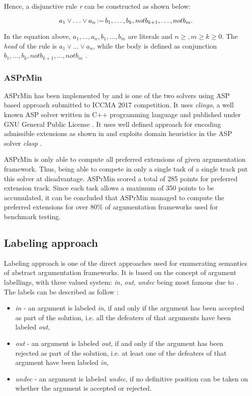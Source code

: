 Hence, a disjunctive rule \textit{r} can be constructed as shown below:

\begin{equation}
	a_1 \lor \ldots \lor a_n \mathop{\vcenter{\hbox{$:$}}-} b_1, \ldots, b_k, not b_{k+1}, \ldots, not b_m.
\end{equation}

In the equation above, $ a_1, \ldots, a_n, b_1, \ldots, b_m$ are literals and $ n \geq , m \geq k \geq 0$. The \textit{head} of the rule is $ a_1 \lor \ldots \lor a_n $, while the body is defined as conjunction $ b_1, \ldots, b_k, not b_{k+1}, \ldots, not b_m $ \citep{bonattiASP}.


\subsubsection{ASPrMin}
ASPrMin has been implemented by \citet{asprmin} and is one of the two solvers using ASP based approach submitted to ICCMA 2017 competition. It uses \textit{clingo}, a well known ASP solver written in C++ programming language and published under GNU General Public License \citep{clingo}. It uses well defined approach for encoding admissible extensions as shown in \citet{asp3} and exploits domain heuristics in the ASP solver \textit{clasp} \citep{asprmin}.

ASPrMin is only able to compute all preferred extensions of given argumentation framework. Thus, being able to compete in only a single task of a single track put this solver at disadvantage. ASPrMin scored a total of 285 points for preferred extension track. Since each task allows a maximum of 350 points to be accumulated, it can be concluded that ASPrMin managed to compute the preferred extensions for over 80\% of argumentation frameworks used for benchmark testing.

\subsection{Labeling approach}
Labeling approach is one of the direct approaches used for enumerating semantics of abstract argumentation frameworks. It is based on the concept of argument labellings, with three valued system: \textit{in}, \textit{out}, \textit{undec} being most famous due to \citet{caminadaLabeling}. The labels can be described as follow \citep{caminada2008gentle}:

\begin{itemize}
	\item \textit{in} - an argument is labeled \textit{in}, if and only if the argument has been accepted as part of the solution, i.e. all the defeaters of that arguments have been labeled \textit{out},
	\item \textit{out} - an argument is labeled \textit{out}, if and only if the argument has been rejected as part of the solution, i.e. at least one of the defeaters of that argument have been labeled \textit{in},
	\item \textit{undec} - an argument is labeled \textit{undec}, if no definitive position can be taken on whether the argument is accepted or rejected.
\end{itemize}

